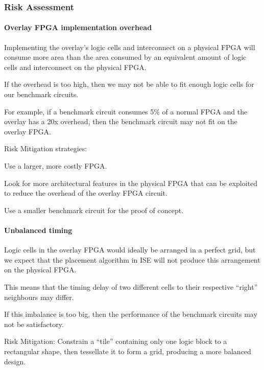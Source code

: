 \subsubsection{Risk Assessment}

\paragraph{Overlay FPGA implementation overhead}
\label{risk-size}

\begin{itemlist}
	\item Implementing the overlay's logic cells and interconnect on a physical FPGA will consume more area than the area consumed by an equivalent amount of logic cells and interconnect on the physical FPGA.
	\item If the overhead is too high, then we may not be able to fit enough logic cells for our benchmark circuits.
	\item For example, if a benchmark circuit consumes 5\% of a normal FPGA and the overlay has a 20x overhead, then the benchmark circuit may not fit on the overlay FPGA.
	\item Risk Mitigation strategies: \
		\begin{itemlist}
			\item Use a larger, more costly FPGA.
			\item Look for more architectural features in the physical FPGA that can be exploited to reduce the overhead of the overlay FPGA circuit.
			\item Use a smaller benchmark circuit for the proof of concept.
		\end{itemlist}
\end{itemlist}

\paragraph{Unbalanced timing}

\begin{itemlist}
	\item Logic cells in the overlay FPGA would ideally be arranged in a perfect grid, but we expect that the placement algorithm in ISE will not produce this arrangement on the physical FPGA.
	\item This means that the timing delay of two different cells to their respective ``right'' neighbours may differ.
	\item If this imbalance is too big, then the performance of the benchmark circuits may not be satisfactory.
	\item Risk Mitigation: Constrain a ``tile'' containing only one logic block to a rectangular shape, then tessellate it to form a grid, producing a more balanced design.
\end{itemlist}

